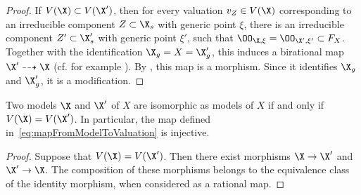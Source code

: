 \begin{proof}
    If $V(\X) \subset V(\X')$, then for every valuation $v_Z \in V(\X)$ corresponding to an irreducible component $Z\subset \X_s$ with generic point $\xi$,
    there is an irreducible component $Z' \subset \X'_s$ with generic point $\xi'$, such that $\OO_{\X,\xi} = \OO_{\X',\xi'} \subset F_X$.
    Together with the identification $\X_g = X = \X'_g$, this induces a birational map $\X' \dashrightarrow \X$ (cf. for example \cite[Lemma 29.50.2.]{Stacks}).
    By \cite[Theorem 8.3.20]{Liu}, this map is a morphism. Since it identifies $\X_g$ and $\X'_g$, it is a modification.
\end{proof}

\begin{corollary}
    Two models $\X$ and $\X'$ of $X$ are isomorphic as models of $X$ if and only if $V(\X) = V(\X')$.
    In particular, the map defined in~\eqref{eq:mapFromModelToValuation} is injective.
\end{corollary}

\begin{proof}
    Suppose that $V(\X) = V(\X')$.
    Then there exist morphisms $\X\to \X'$ and $\X' \to \X$.
    The composition of these morphisms belongs to the equivalence class of the identity morphism, when considered as a rational map.
\end{proof}

